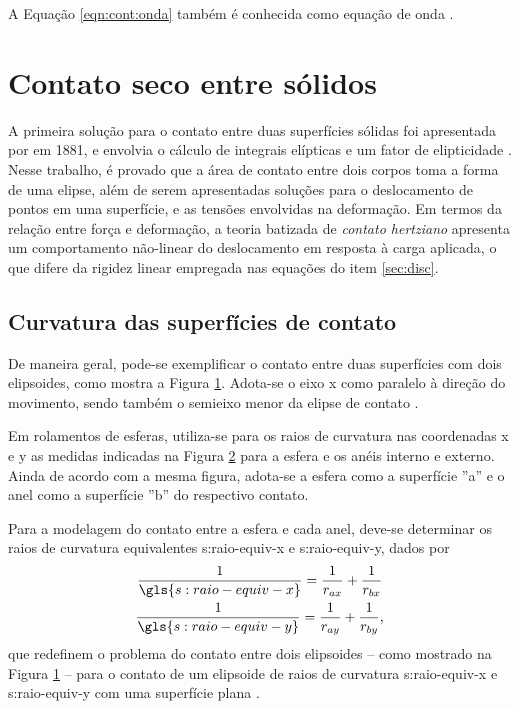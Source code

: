 \documentclass[12pt,oneside,english,brazil,lmodern,siglas,simbolos,cite=num]{ucsmonograph}
\begin{document}
	A Equação \ref{eqn:cont:onda} também é conhecida como equação de onda \cite{rao:2008}. 
	
	\section{Contato seco entre sólidos} \label{sec:contato-seco}
	A primeira solução para o contato entre duas superfícies sólidas foi apresentada por  em 1881, e envolvia o cálculo de integrais elípticas e um fator de elipticidade \cite{hertz:1881}.
	Nesse trabalho, é provado que a área de contato entre dois corpos toma a forma de uma elipse, além de serem apresentadas soluções para o deslocamento de pontos em uma superfície, e as tensões envolvidas na deformação.
	Em termos da relação entre força e deformação, a teoria batizada de \emph{contato hertziano} apresenta um comportamento não-linear do deslocamento em resposta à carga aplicada, o que difere da rigidez linear empregada nas equações do item \ref{sec:disc}.
	
	\subsection{Curvatura das superfícies de contato} \label{sec:curvatura-contato}
	De maneira geral, pode-se exemplificar o contato entre duas superfícies com dois elipsoides, como mostra a Figura \ref{fig:contato-elipses}.
	Adota-se o eixo x como paralelo à direção do movimento, sendo também o semieixo menor da elipse de contato \cite{hamrock:1991}.
	\begin{figure}[ht]
		\label{fig:contato-elipses}
	\end{figure}

	Em rolamentos de esferas, utiliza-se para os raios de curvatura nas coordenadas x e y as medidas indicadas na Figura \ref{fig:raios-rolamento} para a esfera e os anéis interno e externo.
	Ainda de acordo com a mesma figura, adota-se a esfera como a superfície ''a'' e o anel como a superfície ''b'' do respectivo contato.
	\begin{figure}[b]
		\label{fig:raios-rolamento}
	\end{figure}

	Para a modelagem do contato entre a esfera e cada anel, deve-se determinar os raios de curvatura equivalentes \gls{s:raio-equiv-x} e \gls{s:raio-equiv-y}, dados por
	\begin{gather}
		\frac{1}{\gls{s:raio-equiv-x}} = \frac{1}{r_{ax}} +
		\frac{1}{r_{bx}} \label{eqn:seco:r-equiv-x} \\
		\frac{1}{\gls{s:raio-equiv-y}} = \frac{1}{r_{ay}} +
		\frac{1}{r_{by}} \label{eqn:seco:r-equiv-y},
	\end{gather}
	que redefinem o problema do contato entre dois elipsoides -- como mostrado na Figura \ref{fig:contato-elipses} -- para o contato de um elipsoide de raios de curvatura \gls{s:raio-equiv-x} e \gls{s:raio-equiv-y} com uma superfície plana \cite{hamrock:1991}.
	
\end{document}
